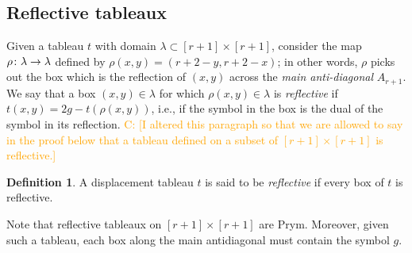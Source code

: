 \documentclass[11pt,reqno]{amsart}
\newcommand*{\maps}{\nobreak\mskip2mu\mathpunct{}\nonscript
  \mkern-\thinmuskip{:}\mskip6muplus1mu\relax}
\newcommand{\caelan}[1]{\textcolor{orange}{\sf C: [#1]}}
\newcommand{\steven}[1]{\textcolor{pink}{\sf S: [#1]}}
\theoremstyle{definition}
\newtheorem{definition}{Definition}[section]
\theoremstyle{problem}
\theoremstyle{plain}
\theoremstyle{remark}
\theoremstyle{theorem}
\numberwithin{equation}{section}
\numberwithin{figure}{section}
\begin{document}

\subsection{Reflective tableaux}\label{sec:reflective}

Given a tableau $t$ with domain $\lambda \subset [r+1]\times[r+1]$,
consider the map $\rho\maps\lambda\to\lambda$ defined by
$\rho(x,y)=(r+2-y, r+2-x)$; in other words, $\rho$ picks out the box
which is the reflection of $(x,y)$ across the \textit{main
  anti-diagonal} $A_{r+1}$.  We say that a box $(x,y) \in \lambda$ for
which $\rho(x,y) \in \lambda$ is \textit{reflective} if
$t(x,y) = 2g - t(\rho(x,y))$, i.e., if the symbol in the box is the
dual of the symbol in its reflection.  \caelan{I altered this
  paragraph so that we are allowed to say in the proof below that a
  tableau defined on a subset of $[r+1]\times[r+1]$ is reflective.}


\begin{definition}
  A displacement tableau $t$ is said to be \textit{reflective} if
  every box of $t$ is reflective.
\end{definition}
\noindent Note that reflective tableaux on $[r+1]\times[r+1]$ are
Prym.  Moreover, given such a tableau, each box along the main
antidiagonal must contain the symbol $g$.

\end{document}

